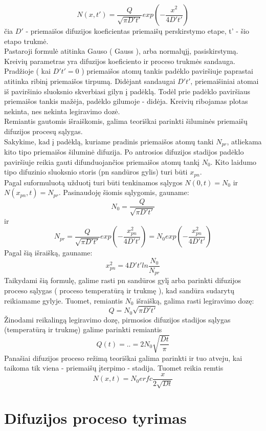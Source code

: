 \documentclass[11pt,a4paper]{article}
\begin{document}
\[ N(x,t') = \frac{Q}{\sqrt{\pi D't'}} exp \left (-\frac{x^2}{4D't'} \right ) \]
čia $D'$ - priemaišos difuzijos koeficientas priemaišų perskirstymo etape, t' - šio etapo trukmė.\\
Pastaroji formulė atitinka Gauso ( Gauss ), arba normalųjį, pasiskirstymą. Kreivių parametras yra difuzijos koeficiento ir proceso trukmės sandauga. Pradžioje ( kai $D't' = 0$ ) priemaišos atomų tankis padėklo paviršiuje paprastai atitinka ribinį priemaišos tirpumą. Didėjant sandaugai $D't'$, priemaišiniai atomai iš paviršinio sluoksnio skverbiasi gilyn į padėklą. Todėl prie padėklo paviršiaus priemaišos tankis mažėja, padėklo gilumoje - didėja. Kreivių ribojamas plotas nekinta, nes nekinta legiravimo dozė.\\
Remiantis gautomis išraiškomis, galima teoriškai parinkti šiluminės priemaišų difuzijos procesų sąlygas.\\
Sakykime, kad į padėklą, kuriame pradinis priemaišos atomų tanki $N_{pr}$, atliekama kito tipo priemaišos šiluminė difuzija. Po antrosios difuzijos stadijos padėklo paviršiuje reikia gauti difunduojančios priemaišos atomų tankį $N_0$. Kito laidumo tipo difuzinio sluoksnio storis (pn sandūros gylis) turi būti $x_{pn}$.\\
Pagal suformuluotą užduotį turi būti tenkinamos sąlygos $N(0,t) = N_0$ ir $N(x_{pn},t) = N_{pr}$. Pasinaudoję šiomis sąlygomis, gauname:\\
\[N_0 = \frac{Q}{\sqrt{\pi D't'}}\]
ir
\[ N_{pr} = \frac{Q}{\sqrt{\pi D't'}}exp \left ( - \frac{x^2_{pn}}{4D't'} \right ) = N_0 exp \left ( - \frac{x^2_{pn}}{4D't'} \right ) \]
Pagal šią išraišką, gauname:
\[x^2_{pn} = 4D't'ln \frac{N_0}{N_{pr}} \]
Taikydami šią formulę, galime rasti pn sandūros gylį arba parinkti difuzijos proceso sąlygas ( proceso temperatūrą ir trukmę ), kad sandūra sudarytų reikiamame gylyje. Tuomet, remiantis $N_0$ išraišką, galima rasti legiravimo dozę:
\[Q = N_{0}\sqrt{\pi D't'}\]
Žinodami reikalingą legiravimo dozę, pirmosios difuzijos stadijos sąlygas (temperatūrą ir trukmę) galime parinkti remiantis
\[Q(t) = .. = 2N_0 \sqrt{\frac{Dt}{\pi}}\]
Panašiai difuzijos proceso režimą teoriškai galima parinkti ir tuo atveju, kai taikoma tik viena - priemaišų įterpimo - stadija. Tuomet reikia remtis
\[N(x,t) = N_0 erfc\frac{x}{2 \sqrt{Dt}}\]


\section{Difuzijos proceso tyrimas}
\end{document}
